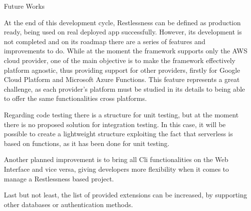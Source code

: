 \begin{chapter}{Future Works}

    At the end of this development cycle, Restlessness can be defined as production
    ready, being used on real deployed app successfully.
    However, its development is not completed and on its roadmap there are a series
    of features and improvements to do. While at the moment the framework supports
    only the AWS cloud provider, one of the main objective is to make the framework
    effectively platform agnostic, thus providing support for other providers, firstly
    for Google Cloud Platform and Microsoft Azure Functions. This feature represents
    a great challenge, as each provider's platform must be studied in its details
    to being able to offer the same functionalities cross platforms.

    Regarding code testing there is a structure for unit testing, but at the moment
    there is no proposed solution for integration testing. In this case, it will be
    possible to create a lightweight structure exploiting the fact that serverless
    is based on functions, as it has been done for unit testing.

    Another planned improvement is to bring all Cli functionalities on the Web
    Interface and vice versa, giving developers more flexibility when it comes
    to manage a Restlessness based project.

    Last but not least, the list of provided extensions can be increased, by
    supporting other databases or authentication methods.

\end{chapter}